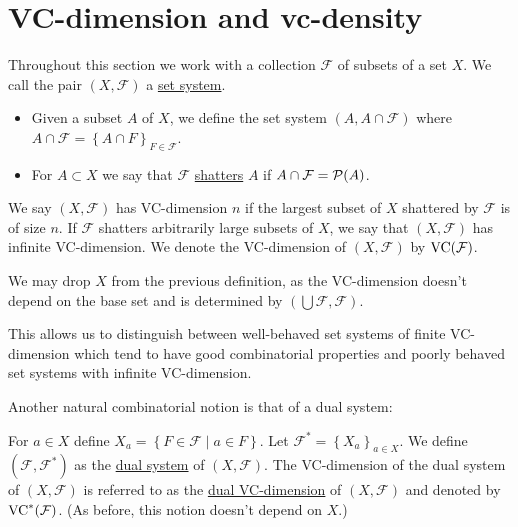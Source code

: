 \documentclass{amsart}
\newcommand{\MM}{\mathscr M}
\newcommand{\F}{\mathcal F}
\newcommand{\defn}{\underline}
\newcommand{\A}{\mathcal A}
\newcommand{\B}{\mathcal B}
\newcommand{\curly}[1]{\left\{#1\right\}}
\begin{document}


\section{VC-dimension and vc-density}


\begin{Definition}
  Throughout this section we work with a collection $\F$ of subsets of a set $X$.
  We call the pair $(X, \F)$ a \defn{set system}.
  \begin{itemize}
  \item Given a subset $A$ of $X$, we define the set system $(A, A \cap \F)$
    where $A \cap \F = \curly{A \cap F}_{F\in \F}$.
  \item For $A \subset X$ we say that $\F$ \defn{shatters} $A$ if $A \cap \F = \PP(A)$.
  \end{itemize}    
\end{Definition}  

\begin{Definition}
  We say $(X, \F)$ has VC-dimension $n$ if the largest subset of $X$ shattered by $\F$ is of size $n$.
  If $\F$ shatters arbitrarily large subsets of $X$, we say that $(X, \F)$ has infinite VC-dimension.
  We denote the VC-dimension of $(X, \F)$ by $\VC(\F)$.
\end{Definition}  

\begin{Note}
  We may drop $X$ from the previous definition, as the VC-dimension doesn't depend on the base set and is determined by $(\bigcup \F, \F)$.
\end{Note}
This allows us to distinguish between well-behaved set systems of finite VC-dimension which tend to have good combinatorial properties and
poorly behaved set systems with infinite VC-dimension.

Another natural combinatorial notion is that of a dual system:
\begin{Definition}
  For $a \in X$ define $X_a = \curly{F \in \F \mid a \in F}$.
  Let $\F^* = \curly{X_a}_{a \in X}$.
  We define $(\F, \F^*)$ as the \defn{dual system} of $(X, \F)$.
  The VC-dimension of the dual system of $(X, \F)$ is referred to as the \defn{dual VC-dimension} of $(X, \F)$ and denoted by $\VC^*(\F)$.
  (As before, this notion doesn't depend on $X$.)
\end{Definition}  
\end{document}

